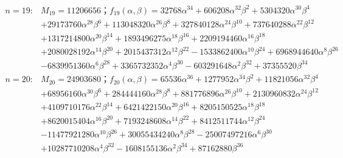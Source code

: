 \begin{flushleft}
\begin{align*}
n=19:&M_{19}=11206656；f_{19}(\alpha,\beta)=32768\alpha^{34}+606208\alpha^{32}\beta^2+5304320\alpha^{30}\beta^4\\ 
&+29173760\alpha^{28}\beta^6+113048320\alpha^{26}\beta^{8}+327840128\alpha^{24}\beta^{10}+737640288\alpha^{22}\beta^{12}\\ 
&+1317214800\alpha^{20}\beta^{14}+1893496275\alpha^{18}\beta^{16}+2209194460\alpha^{16}\beta^{18}\\ 
&+2080028192\alpha^{14}\beta^{20}+2015437312\alpha^{12}\beta^{22}-1533862400\alpha^{10}\beta^{24}+6968944640\alpha^8\beta^{26}\\ &-6839951360\alpha^6\beta^{28}+3365732352\alpha^4\beta^{30}-603291648\alpha^2\beta^{32}+37355520\beta^{34}\\
n=20:&M_{20}=24903680；f_{20}(\alpha,\beta)=65536\alpha^{36}+1277952\alpha^{34}\beta^2+11821056\alpha^{32}\beta^4\\ 
&+68956160\alpha^{30}\beta^6+284444160\alpha^{28}\beta^{8}+881776896\alpha^{26}\beta^{10}+2130960832\alpha^{24}\beta^{12}\\ 
&+4109710176\alpha^{22}\beta^{14}+6421422150\alpha^{20}\beta^{16}+8205150525\alpha^{18}\beta^{18}\\ 
&+8620015404\alpha^{16}\beta^{20}+7193248608\alpha^{14}\beta^{22}+8412511744\alpha^{12}\beta^{24}\\ 
&-11477921280\alpha^{10}\beta^{26}+30055434240\alpha^8\beta^{28}-25007497216\alpha^6\beta^{30}\\ &+10287710208\alpha^4\beta^{32}-1608155136\alpha^2\beta^{34}+87162880\beta^{36}\\
\end{align*}
\end{flushleft}
\newpage

